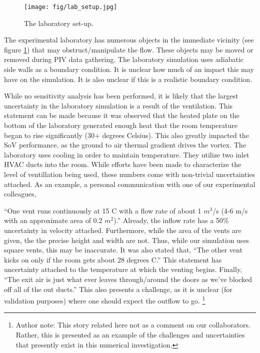   \begin{figure}[!htb]
    \begin{center}
     \texttt{[image: fig/lab\_setup.jpg]}
     \caption{The laboratory set-up.}
     \label{lab}
    \end{center}
  \end{figure}

The experimental laboratory has numerous objects
in the immediate vicinity (see figure \ref{lab}) that may
obstruct/manipulate the flow. These objects may be moved or removed
during PIV data gathering. The laboratory simulation uses adiabatic side
walls as a boundary condition. It is unclear how much of an impact this
may have on the simulation. It is also unclear if this is a realistic
boundary condition. 

While no sensitivity analysis has been performed, it is likely that the
largest uncertainty in the laboratory simulation is a result of the
ventilation. This statement can be made because it was observed that the
heated plate on the bottom of the laboratory generated enough heat that
the room temperature began to rise significantly (30+ degrees
Celsius). This also greatly impacted the SoV performance, as the ground
to air thermal gradient drives the vortex. The laboratory uses cooling
in order to maintain temperature. They utilize two inlet HVAC ducts into
the room. While efforts have been made to characterize the level of
ventillation being used, these numbers come with non-trivial
uncertainties attached. As an example, a personal communication with one
of our experimental colleagues, 

``One vent runs continuously at 15 C with a flow rate of about 1
$m^3$/s (4-6 m/s with an approximate area of 0.2 $m^2$).''
Already, the inflow rate has a 50\% uncertainty in velocity
attached. Furthermore, while the area of the vents are given, the the
precise height and width are not. Thus, while our simulation uses square
vents, this may be inaccurate. 
It was also stated that, ``The other vent kicks on only if the
room gets about 28 degrees C.'' This statement has uncertainty attached to the
temperature at which the venting begins. Finally, ``The exit air is just
what ever leaves through/around the doors as we've blocked off all of
the out ducts.'' This also presents a challenge, as it is unclear (for
validation purposes) where one should expect the outflow to
go. \footnote{\normalsize Author note: This story related here not as a comment on
our collaborators. Rather, this is presented as an example of the challenges
and uncertainties that presently exist in this numerical investigation.}

